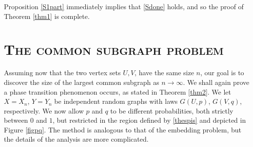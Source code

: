\documentclass[reqno]{amsart}
\theoremstyle{theorem}
\theoremstyle{definition}
\theoremstyle{remark}
\newcommand{\1}{{\text{\Large $\mathfrak 1$}}}	%
\numberwithin{equation}{section}
\begin{document}
Proposition \ref{S1part} immediately implies that \eqref{Sdone} holds,
and so the proof of Theorem \ref{thm1} is complete.





\section{\bfseries\scshape The common subgraph problem}
Assuming now that the two vertex sets $U, V$, have the same size $n$, our goal
is to discover the size of the largest common subgraph as $n \to \infty$.
We shall again prove a phase transition phenomenon occurs, as stated in
Theorem \ref{thm2}.
We let $X=X_n$, $Y=Y_n$ be independent random graphs with 
laws $G(U,p)$, $G(V,q)$, respectively. 
We now allow $p$ and $q$ to be different probabilities, both strictly
between $0$ and $1$, but restricted in the region defined by \eqref{thespis} 
and depicted in Figure \ref{figpq}. The method is analogous to that
of the embedding problem, but the details of the analysis are more complicated.
\end{document}
